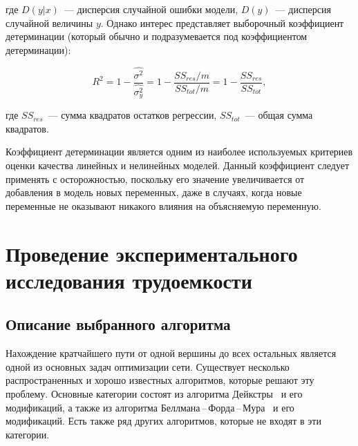 \documentclass[a4paper, article, 14pt]{extarticle}
\begin{document}
\noindent где $D(y | x)$~--- дисперсия случайной ошибки модели, $D(y)$~--- дисперсия случайной величины $y$. Однако интерес представляет выборочный коэффициент детерминации (который обычно и подразумевается под коэффициентом детерминации):

\begin{equation}\label{eq:coefficient_of_determination}
	R^2 = 1 - \frac{\widehat{\sigma^2}}{\widehat{\sigma_y^2}} = 1 - \frac{SS_{res} / m}{SS_{tot} / m} = 1 - \frac{SS_{res}}{SS_{tot}},
\end{equation}

\noindent где $SS_{res}$~--- сумма квадратов остатков регрессии, $SS_{tot}$~--- общая сумма квадратов.

Коэффициент детерминации является одним из наиболее используемых критериев оценки качества линейных и нелинейных моделей. Данный коэффициент следует применять с осторожностью, поскольку его значение увеличивается от добавления в модель новых переменных, даже в случаях, когда новые переменные не оказывают никакого влияния на объясняемую переменную.


\section{Проведение экспериментального исследования трудоемкости}\label{sec:practical_complexity_research}

\subsection{Описание выбранного алгоритма}\label{sec:pallotino_algorithm}

Нахождение кратчайшего пути от одной вершины до всех остальных является одной из основных задач оптимизации сети. Существует несколько распространенных и хорошо известных алгоритмов, которые решают эту проблему. Основные категории состоят из алгоритма Дейкстры~\cite{dijkstra} и его модификаций, а также из алгоритма Беллмана\,--\,Форда\,--\,Мура~\cite{bellman, ford, moore} и его модификаций. Есть также ряд других алгоритмов, которые не входят в эти категории.
\end{document}
